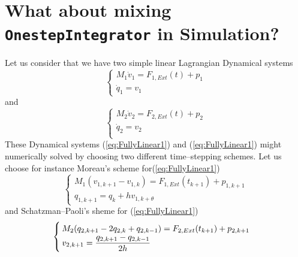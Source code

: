 \section{What about mixing {\tt OnestepIntegrator} in Simulation?}
\label{Sec:MisingOSI}
Let us consider that we have two simple linear Lagrangian Dynamical systems
\begin{equation}
  \label{eq:FullyLinear1}
  \begin{cases}
    M_1 \dot v_1  = F_{1,Ext}(t) + p_1   \\
    \dot q_1 = v_1
  \end{cases}
\end{equation}
and
\begin{equation}
  \label{eq:FullyLinear1}
  \begin{cases}
    M_2 \dot v_2   = F_{2,Ext}(t) + p_2  \\
    \dot q_2 = v_2 \\
  \end{cases}
\end{equation}
These Dynamical systems (\ref{eq:FullyLinear1}) and (\ref{eq:FullyLinear1}) might numerically solved by choosing two different time--stepping schemes. Let us choose for instance Moreau's scheme for(\ref{eq:FullyLinear1})
\begin{equation}
  \label{eq:FullyLinear1-TS}
  \begin{cases}
    M_1 (v_{1,k+1}-v_{1,k})  = F_{1,Ext}(t_{k+1}) + p_{1,k+1}   \\
    q_{1,k+1} = q_{k}+ h  v_{1,k+\theta}
  \end{cases}
\end{equation}
and Schatzman--Paoli's sheme for (\ref{eq:FullyLinear1})
\begin{equation}
  \label{eq:FullyLinear1-TS}
  \begin{cases}
    M_2(q_{2,k+1}-2q_{2,k}+q_{2,k-1})  = F_{2,Ext}(t_{k+1}) + p_{2,k+1}  \\
    v_{2,k+1} = \displaystyle \frac{q_{2,k+1}-q_{2,k-1}}{2h} \\
  \end{cases}
\end{equation}


